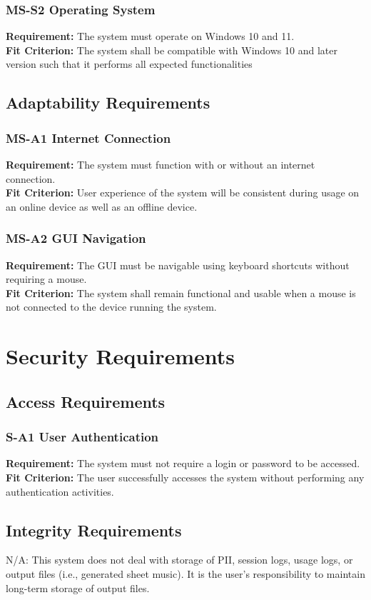 \documentclass[12pt]{article}
\begin{document}
\subsubsection*{MS-S2 Operating System}
\textbf{Requirement:} The system must operate on Windows 10 and 11. \\ 
\textbf{Fit Criterion:} The system shall be compatible with Windows 10 and later version such that it performs all expected functionalities

\subsection{Adaptability Requirements}
\subsubsection*{MS-A1 Internet Connection}
\textbf{Requirement:} The system must function with or without an internet connection. \\ 
\textbf{Fit Criterion:} User experience of the system will be consistent during usage on an online device as well as an offline device.
\subsubsection*{MS-A2 GUI Navigation}
\textbf{Requirement:} The GUI must be navigable using keyboard shortcuts without requiring a mouse. \\ 
\textbf{Fit Criterion:} The system shall remain functional and usable when a mouse is not connected to the device running the system.


\section{Security Requirements}
\subsection{Access Requirements}
\subsubsection*{S-A1 User Authentication}
\textbf{Requirement:} The system must not require a login or password to be accessed. \\ 
\textbf{Fit Criterion:} The user successfully accesses the system without performing any authentication activities.

\subsection{Integrity Requirements}
N/A: This system does not deal with storage of PII, session logs, usage logs, or output files (i.e., generated sheet music). It is the user's responsibility to maintain long-term storage of output files.
\end{document}
